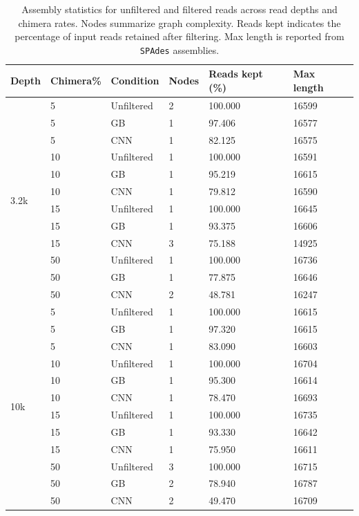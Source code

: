\begin{table}[t]
\centering
\caption{Assembly statistics for unfiltered and filtered reads across read depths and chimera rates. Nodes summarize graph complexity. Reads kept indicates the percentage of input reads retained after filtering. Max length is reported from \texttt{SPAdes} assemblies.}
\label{tab:assembly_bandage}
\scriptsize
\begin{tabular}{|l|l|l|l|l|l|}
\hline
Depth & Chimera\% & Condition & Nodes & Reads kept (\%) & Max length \\
\hline
\multirow{12}{*}{3.2k}
& 5  & Unfiltered & 2 & 100.000 & 16599 \\
& 5  & GB         & 1 & 97.406  & 16577 \\
& 5  & CNN        & 1 & 82.125  & 16575 \\
& 10 & Unfiltered & 1 & 100.000 & 16591 \\
& 10 & GB         & 1 & 95.219  & 16615 \\
& 10 & CNN        & 1 & 79.812  & 16590 \\
& 15 & Unfiltered & 1 & 100.000 & 16645 \\
& 15 & GB         & 1 & 93.375  & 16606 \\
& 15 & CNN        & 3 & 75.188  & 14925 \\
& 50 & Unfiltered & 1 & 100.000 & 16736 \\
& 50 & GB         & 1 & 77.875  & 16646 \\
& 50 & CNN        & 2 & 48.781  & 16247 \\
\hline
\multirow{12}{*}{10k}
& 5  & Unfiltered & 1 & 100.000 & 16615 \\
& 5  & GB         & 1 & 97.320  & 16615 \\
& 5  & CNN        & 1 & 83.090  & 16603 \\
& 10 & Unfiltered & 1 & 100.000 & 16704 \\
& 10 & GB         & 1 & 95.300  & 16614 \\
& 10 & CNN        & 1 & 78.470  & 16693 \\
& 15 & Unfiltered & 1 & 100.000 & 16735 \\
& 15 & GB         & 1 & 93.330  & 16642 \\
& 15 & CNN        & 1 & 75.950  & 16611 \\
& 50 & Unfiltered & 3 & 100.000 & 16715 \\
& 50 & GB         & 2 & 78.940  & 16787 \\
& 50 & CNN        & 2 & 49.470  & 16709 \\

\end{tabular}
\end{table}
